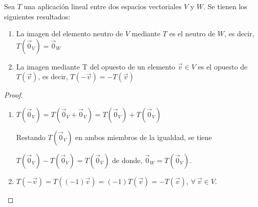 \begin{theorem}
\label{Prop31}

Sea $T$ una aplicación lineal entre dos espacios vectoriales $V$ y $W$. Se tienen los siguientes resultados:

\begin{enumerate}

\item La imagen del elemento neutro de $V$ mediante $T$ es el neutro de $W$, es decir, $T(\vec{0}_V)= \vec{0}_W$


\item La imagen mediante T del opuesto de un elemento  $\vec{v}\in V$ es el opuesto de $T(\vec{v})$, es decir,  $T(-\vec{v})=-T(\vec{v})$

\end{enumerate}

\begin{proof}

\begin{enumerate}

\item  $T(\vec{0}_V)= T(\vec{0}_V +\vec{0}_V )= T(\vec{0}_V) + T(\vec{0}_V)$

Restando $T(\vec{0}_V)$ en ambos miembros de la igualdad, se tiene 

\bigskip

$T(\vec{0}_V)- T(\vec{0}_V)= T(\vec{0}_V)$
\noindent
de donde, $\vec{0}_W  = T(\vec{0}_V) $.

\bigskip

\item     $T(-\vec{v})= T((-1)\vec{v})= (-1)T(\vec{v})=  -T(\vec{v})$, $ \forall ~ \vec{v}\in V$.

\end{enumerate}

\end{proof}

\end{theorem}

\bigskip

\bigskip

